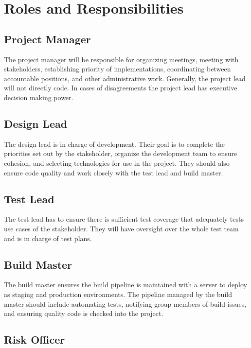 \documentclass{scrreprt}
\begin{document}
\section{Roles and Responsibilities}

\subsection{Project Manager}

The project manager will be responsible for organizing meetings,
meeting with stakeholders, establishing priority of implementations, coordinating
between accountable positions, and other administrative work. 
Generally, the project lead will not directly code.
In cases of disagreements the project lead has executive decision making power.

\subsection{Design Lead}

The design lead is in charge of development. Their goal is
to complete the priorities set out by the stakeholder, organize
the development team to ensure cohesion, and selecting technologies
for use in the project. They should also ensure code quality and
work closely with the test lead and build master.

\subsection{Test Lead}

The test lead has to ensure there is sufficient test coverage
that adequately tests use cases of the stakeholder. They will
have oversight over the whole test team and is in charge of 
test plans.

\subsection{Build Master}

The build master ensures the build pipeline is maintained with
a server to deploy as staging and production environments. The
pipeline managed by the build master should include automating
tests, notifying group members of build issues, and ensuring
quality code is checked into the project.

\subsection{Risk Officer}
\end{document}
